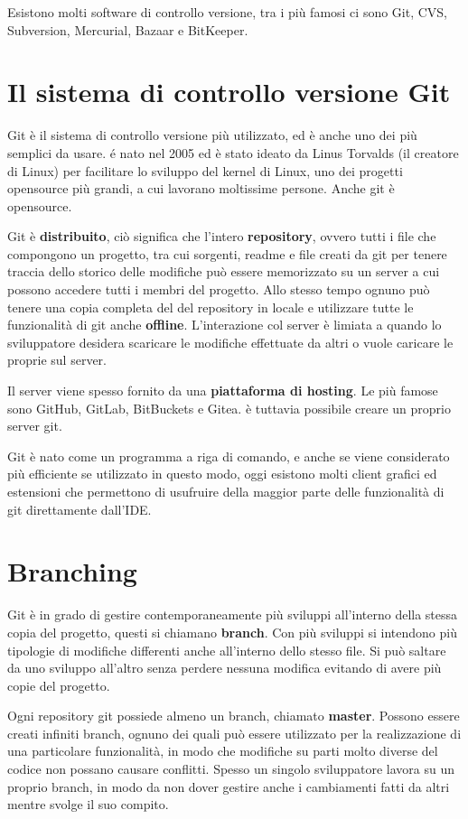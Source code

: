 \documentclass{article}
\begin{document}
Esistono molti software di controllo versione, tra i più famosi ci sono Git,
CVS, Subversion, Mercurial, Bazaar e BitKeeper.

\section{Il sistema di controllo versione Git}
Git è il sistema di controllo versione più utilizzato, ed è anche uno dei più
semplici da usare. é nato nel 2005 ed è stato ideato da Linus Torvalds (il
creatore di Linux) per facilitare lo sviluppo del kernel di Linux, uno dei
progetti opensource più grandi, a cui lavorano moltissime persone. Anche git è
opensource.

Git è \textbf{distribuito}, ciò significa che l'intero \textbf{repository}, ovvero
tutti i file che compongono un progetto, tra cui sorgenti, readme e file creati
da git per tenere traccia dello storico delle modifiche può essere memorizzato
su un server a cui possono accedere tutti i membri del progetto. Allo stesso
tempo ognuno può tenere una copia completa del del repository in locale e
utilizzare tutte le funzionalità di git anche \textbf{offline}. L'interazione col server
è limiata a quando lo sviluppatore desidera scaricare le modifiche effettuate da
altri o vuole caricare le proprie sul server.

Il server viene spesso fornito da una \textbf{piattaforma di hosting}. Le più
famose sono GitHub, GitLab, BitBuckets e Gitea. è tuttavia possibile creare un
proprio server git.

Git è nato come un programma a riga di comando, e anche se viene considerato più
efficiente se utilizzato in questo modo, oggi esistono molti client grafici ed
estensioni che permettono di usufruire della maggior parte delle funzionalità di
git direttamente dall'IDE.

\section{Branching}
Git è in grado di gestire contemporaneamente più sviluppi all'interno della
stessa copia del progetto, questi si chiamano \textbf{branch}. Con più sviluppi si 
intendono più tipologie di modifiche differenti anche all'interno dello stesso file.
Si può saltare da uno sviluppo all'altro senza perdere nessuna modifica
evitando di avere più copie del progetto.

Ogni repository git possiede almeno un branch, chiamato \textbf{master}.
Possono essere creati infiniti branch, ognuno dei quali può essere utilizzato
per la realizzazione di una particolare funzionalità, in modo che modifiche su parti
molto diverse del codice non possano causare conflitti. Spesso un singolo
sviluppatore lavora su un proprio branch, in modo da non dover gestire anche i
cambiamenti fatti da altri mentre svolge il suo compito. 
\end{document}
